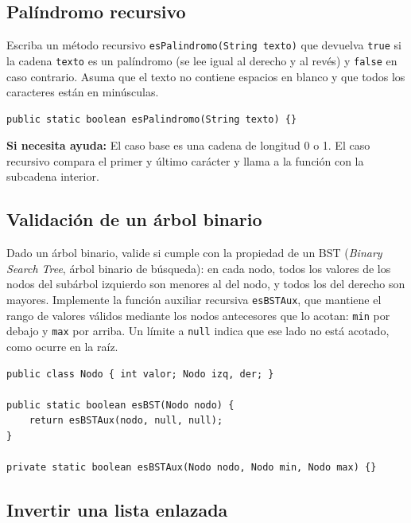 \documentclass[a4paper]{article}
\newcommand{\code}[1]{\texttt{#1}}
\begin{document}
\subsection{Palíndromo recursivo}

Escriba un método recursivo \code{esPalindromo(String texto)} que devuelva \code{true} si la cadena \code{texto} es un palíndromo (se lee igual al derecho y al revés) y \code{false} en caso contrario. Asuma que el texto no contiene espacios en blanco y que todos los caracteres están en minúsculas.

\begin{verbatim}
public static boolean esPalindromo(String texto) {}
\end{verbatim}

\textbf{Si necesita ayuda:} El caso base es una cadena de longitud 0 o 1. El caso recursivo compara el primer y último carácter y llama a la función con la subcadena interior.

\subsection{Validación de un árbol binario}

Dado un árbol binario, valide si cumple con la propiedad de un BST (\textit{Binary Search Tree}, árbol binario de búsqueda): en cada nodo, todos los valores de los nodos del subárbol izquierdo son menores al del nodo, y todos los del derecho son mayores. Implemente la función auxiliar recursiva \code{esBSTAux}, que mantiene el rango de valores válidos mediante los nodos antecesores que lo acotan: \code{min} por debajo y \code{max} por arriba. Un límite a \code{null} indica que ese lado no está acotado, como ocurre en la raíz.

\begin{verbatim}
public class Nodo { int valor; Nodo izq, der; }

public static boolean esBST(Nodo nodo) {
    return esBSTAux(nodo, null, null);
}

private static boolean esBSTAux(Nodo nodo, Nodo min, Nodo max) {}
\end{verbatim}

\subsection{Invertir una lista enlazada}
\label{enlazada}
\end{document}
